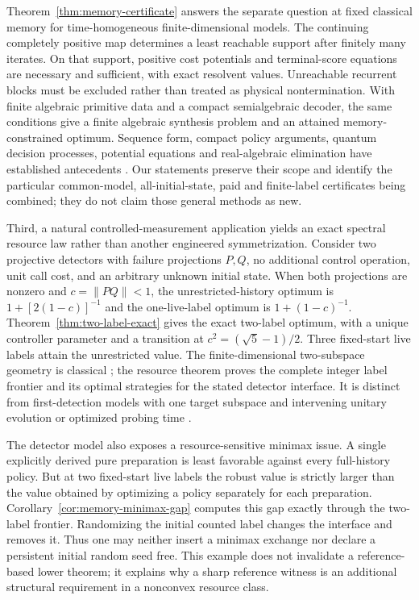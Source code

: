Theorem~\ref{thm:memory-certificate} answers the separate question at fixed classical memory for time-homogeneous finite-dimensional models. The continuing completely positive map determines a least reachable support after finitely many iterates. On that support, positive cost potentials and terminal-score equations are necessary and sufficient, with exact resolvent values. Unreachable recurrent blocks must be excluded rather than treated as physical nontermination. With finite algebraic primitive data and a compact semialgebraic decoder, the same conditions give a finite algebraic synthesis problem and an attained memory-constrained optimum. Sequence form, compact policy arguments, quantum decision processes, potential equations and real-algebraic elimination have established antecedents \cite{Stengel96,Balder89,Barry14,Ying18,Saldi25,Seidenberg54,Chatterjee15,Andriushchenko23}. Our statements preserve their scope and identify the particular common-model, all-initial-state, paid and finite-label certificates being combined; they do not claim those general methods as new.

Third, a natural controlled-measurement application yields an exact spectral resource law rather than another engineered symmetrization. Consider two projective detectors with failure projections $P,Q$, no additional control operation, unit call cost, and an arbitrary unknown initial state. When both projections are nonzero and $c=\|PQ\|<1$, the unrestricted-history optimum is $1+[2(1-c)]^{-1}$ and the one-live-label optimum is $1+(1-c)^{-1}$. Theorem~\ref{thm:two-label-exact} gives the exact two-label optimum, with a unique controller parameter and a transition at $c^2=(\sqrt5-1)/2$. Three fixed-start live labels attain the unrestricted value. The finite-dimensional two-subspace geometry is classical \cite{Halmos69}; the resource theorem proves the complete integer label frontier and its optimal strategies for the stated detector interface. It is distinct from first-detection models with one target subspace and intervening unitary evolution or optimized probing time \cite{Kessler21,DelVecchio26}.

The detector model also exposes a resource-sensitive minimax issue. A single explicitly derived pure preparation is least favorable against every full-history policy. But at two fixed-start live labels the robust value is strictly larger than the value obtained by optimizing a policy separately for each preparation. Corollary~\ref{cor:memory-minimax-gap} computes this gap exactly through the two-label frontier. Randomizing the initial counted label changes the interface and removes it. Thus one may neither insert a minimax exchange nor declare a persistent initial random seed free. This example does not invalidate a reference-based lower theorem; it explains why a sharp reference witness is an additional structural requirement in a nonconvex resource class.

